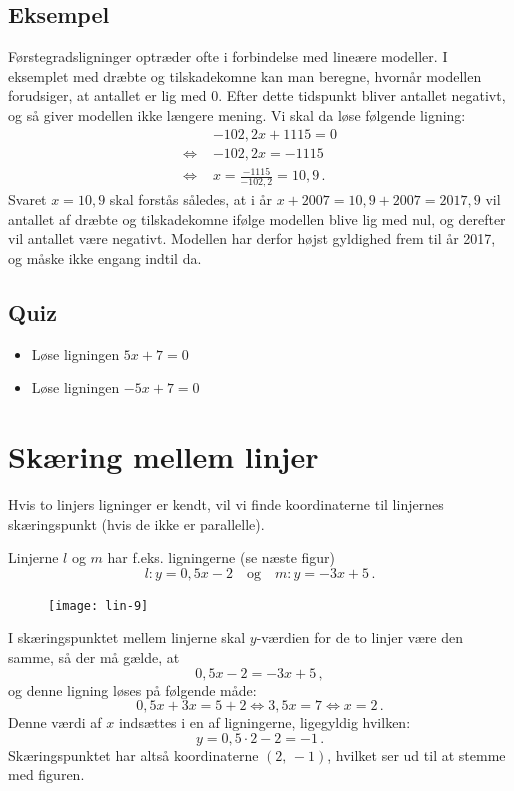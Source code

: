 \documentclass[12pt,oneside,a4paper]{article}
\begin{document}
\begin{tcolorbox}
\subsection{Eksempel}
Førstegradsligninger optræder ofte i forbindelse med lineære modeller. I
eksemplet med dræbte og tilskadekomne kan man beregne, hvornår modellen
forudsiger, at antallet er lig med 0.  Efter dette tidspunkt bliver antallet
negativt, og så giver modellen ikke længere mening.  Vi skal da løse følgende
ligning:
\[
\begin{aligned}
    & -102,2x+1115 = 0  \\
    \Leftrightarrow\,\, & -102,2x = -1115 \\
    \Leftrightarrow\,\, & x = \frac{-1115}{-102,2} = 10,9 \,.
\end{aligned}
\]
Svaret $x=10,9$ skal forstås således, at i år $x + 2007 = 10,9 + 2007 = 2017,9$
vil antallet af dræbte og tilskadekomne ifølge modellen blive lig med nul, og
derefter vil antallet være negativt.  Modellen har derfor højst gyldighed frem
til år 2017, og måske ikke engang indtil da.
\end{tcolorbox}

\subsection{Quiz}
\begin{itemize}
    \item Løse ligningen $5x+7 = 0$
    \item Løse ligningen $-5x+7 = 0$
\end{itemize}



\section{Skæring mellem linjer}
Hvis to linjers ligninger er kendt, vil vi finde koordinaterne til linjernes
skæringspunkt (hvis de ikke er parallelle).

Linjerne $l$ og $m$ har f.eks. ligningerne (se næste figur)
\[
    l: y=0,5x-2\quad{\mbox{og}}\quad m: y=-3x+5 \,.
\]

\begin{figure}[H]
    \centering
    \texttt{[image: lin-9]}
    \caption{}
\end{figure}

I skæringspunktet mellem linjerne skal $y$-værdien for de to linjer være den
samme, så der må gælde, at
\[
0,5x-2 = -3x+5 \,,
\]
og denne ligning løses på følgende måde:
\[
0,5x+3x=5+2 \iff 3,5x=7 \iff x=2 \,.
\]
Denne værdi af $x$ indsættes i en af ligningerne, ligegyldig hvilken:
\[
y=0,5\cdot2-2=-1 \,.
\]
Skæringspunktet har altså koordinaterne $(2,\,-1)$, hvilket ser ud til at
stemme med figuren.
\end{document}
